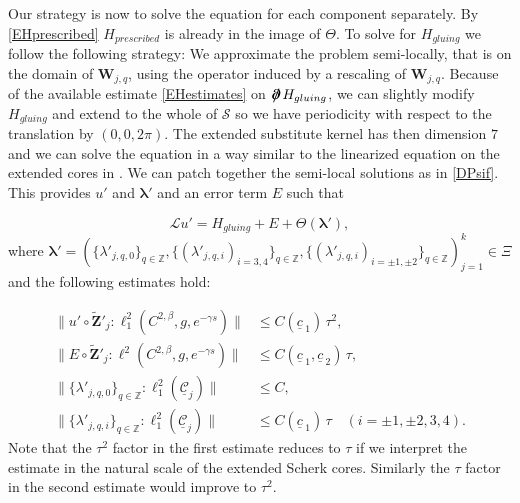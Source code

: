 \documentclass[12pt,namelimits,sumlimits]{amsart}
\theoremstyle{remark}
\numberwithin{equation}{section}
\begin{document}
Our strategy is now to solve the equation for each component separately.
By \ref{EHprescribed}
${{H_{prescribed}}}$ is already in the image of $\Theta$.
To solve for ${{H_{gluing}}}$ we follow the following strategy:
We approximate the problem semi-locally,
that is on the domain of 
${\boldsymbol{W}}_{j,q}$,
using the operator induced by a rescaling of ${\boldsymbol{W}}_{j,q}$.
Because of the available estimate \ref{EHestimates}
on ${{\boldsymbol{\partial}\mspace{.8mu}\!\!\!\!\boldsymbol{/}\,}}{{H_{gluing}}}$,
we can slightly modify ${{H_{gluing}}}$ and extend to the whole of ${{\mathcal{S}}}$
so we have periodicity with respect to the translation by $(0,0,2\pi)$.
The extended substitute kernel has then dimension $7$ and we can solve the equation
in a way similar to the linearized equation on the extended cores in \cite{kapouleas:finite}.
We can patch together the semi-local solutions as in \ref{DPsif}.
This provides $u'$ and ${\boldsymbol{\lambda}}'$ and an error term $E$ 
such that
\addtocounter{theorem}{1}
\begin{equation}
\label{Euone}
{\ensuremath{\mathcal L}} u'= {{H_{gluing}}} + E + \Theta({\boldsymbol{\lambda}}'),
\end{equation}
where
$
{\boldsymbol{\lambda}}'=
\left(
\{\lambda'_{{{j,q}},0}\}_{q\in{\mathbb{Z}}},
\{(\lambda'_{{{j,q}},i})_{i=3,4}\}_{q\in{\mathbb{Z}}},
\{(\lambda'_{{{j,q}},i})_{{i=\pm1,\pm2}}\}_{q\in{\mathbb{Z}}}
\right)_{j=1}^k
\in\Xi
$
and the following estimates hold:
\addtocounter{theorem}{1}
\begin{equation}
\label{Eupestimates}
\begin{aligned}
\|u'
\circ {\widetilde{\boldsymbol{Z}}}'_j
:
\ell^2_1(C^{2,\beta},g,e^{-\gamma s})
\|
&\le
C({\underline{c}\,}_1)\,\tau^2,
\\
\|E
\circ {\widetilde{\boldsymbol{Z}}}'_j
:
\ell^2(C^{2,\beta},g,e^{-\gamma s})
\|
&\le
C({\underline{c}\,}_1,{\underline{c}\,}_2) \,\tau,
\\
\|\{\lambda'_{{{j,q}},0}\}_{q\in{\mathbb{Z}}}:\ell^2_1({\underline{{\mathcal{C}}}}_j)\|
&\le C,
\\
\|\{\lambda'_{{{j,q}},i}\}_{q\in{\mathbb{Z}}}:\ell^2_1({\underline{{\mathcal{C}}}}_j)\|
&\le C({\underline{c}\,}_1)\,\tau
\quad
({{i=\pm1,\pm2}},3,4).
\end{aligned}
\end{equation}
Note that the $\tau^2$ factor in the first estimate reduces to $\tau$
if we interpret the estimate in the natural scale of the extended Scherk cores.
Similarly the $\tau$ factor in the second estimate would improve to $\tau^2$.
\end{document}
